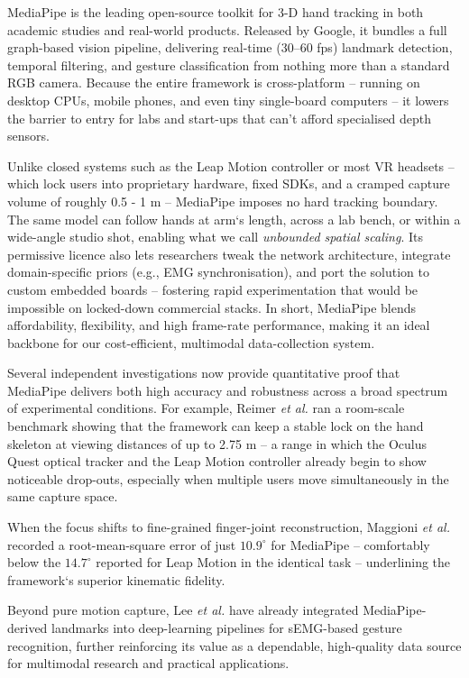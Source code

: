 MediaPipe is the leading open-source toolkit for 3-D hand tracking in both academic studies and real-world products. Released by Google, it bundles a full graph-based vision pipeline, delivering real-time (30–60 fps) landmark detection, temporal filtering, and gesture classification from nothing more than a standard RGB camera. Because the entire framework is cross-platform -- running on desktop CPUs, mobile phones, and even tiny single-board computers -- it lowers the barrier to entry for labs and start-ups that can’t afford specialised depth sensors.

Unlike closed systems such as the Leap Motion controller or most VR headsets -- which lock users into proprietary hardware, fixed SDKs, and a cramped capture volume of roughly 0.5 - 1 m -- MediaPipe imposes no hard tracking boundary. The same model can follow hands at arm`s length, across a lab bench, or within a wide-angle studio shot, enabling what we call \textit{unbounded spatial scaling}. Its permissive licence also lets researchers tweak the network architecture, integrate domain-specific priors (e.g., EMG synchronisation), and port the solution to custom embedded boards -- fostering rapid experimentation that would be impossible on locked-down commercial stacks. In short, MediaPipe blends affordability, flexibility, and high frame-rate performance, making it an ideal backbone for our cost-efficient, multimodal data-collection system.

Several independent investigations now provide quantitative proof that MediaPipe delivers both high accuracy and robustness across a broad spectrum of experimental conditions. For example, Reimer \textit{et al.} \cite{reimer2023evaluation} ran a room-scale benchmark showing that the framework can keep a stable lock on the hand skeleton at viewing distances of up to 2.75 m -- a range in which the Oculus Quest optical tracker and the Leap Motion controller already begin to show noticeable drop-outs, especially when multiple users move simultaneously in the same capture space.  

When the focus shifts to fine-grained finger-joint reconstruction, Maggioni \textit{et al.} \cite{maggioni2025optimisation} recorded a root-mean-square error of just \(10.9^{\circ}\) for MediaPipe -- comfortably below the \(14.7^{\circ}\) reported for Leap Motion in the identical task -- underlining the framework`s superior kinematic fidelity.  

Beyond pure motion capture, Lee \textit{et al.} \cite{lee2022explainable} have already integrated MediaPipe-derived landmarks into deep-learning pipelines for sEMG-based gesture recognition, further reinforcing its value as a dependable, high-quality data source for multimodal research and practical applications.

